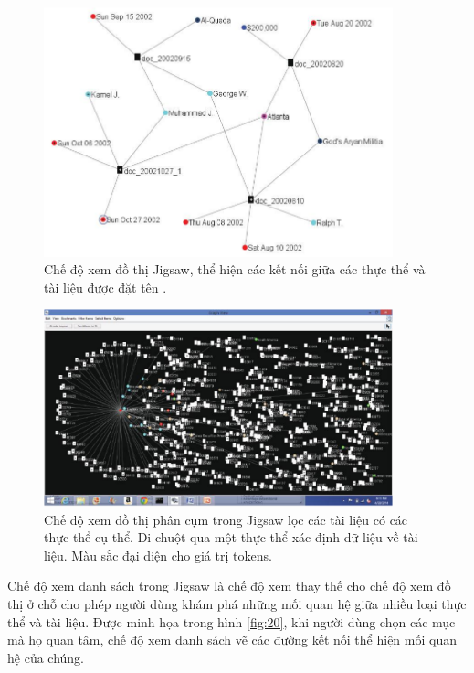 \documentclass[14pt, a4paper]{article}
\numberwithin{equation}{section}
\numberwithin{figure}{section}
\numberwithin{dl}{section}
\numberwithin{md}{section}
\numberwithin{bd}{section}
\numberwithin{dn}{section}
\numberwithin{hq}{section}
\begin{document}
    \begin{figure}[h!]
        \centering
        \includegraphics[width=0.9\textwidth]{18.png}
        \caption{Chế độ xem đồ thị Jigsaw, thể hiện các kết nối giữa các thực thể và tài liệu được đặt tên \cite{155}.}
        \label{fig:18}
    \end{figure}


    \begin{figure}[h!]
        \centering
        \includegraphics[width=0.9\textwidth]{19.png}
        \caption{Chế độ xem đồ thị phân cụm trong Jigsaw lọc các tài liệu có các thực thể cụ thể.
        Di chuột qua một thực thể xác định dữ liệu về tài liệu.
        Màu sắc đại diện cho giá trị tokens.}
        \label{fig:19}
    \end{figure}

    Chế độ xem danh sách trong Jigsaw là chế độ xem thay thế cho chế độ xem đồ thị ở chỗ cho phép người dùng khám phá những mối quan hệ giữa nhiều loại thực thể và tài liệu.
    Được minh họa trong hình \ref{fig:20}, khi người dùng chọn các mục mà họ quan tâm, chế độ xem danh sách vẽ các đường kết nối thể hiện mối quan hệ của chúng.
\end{document}
